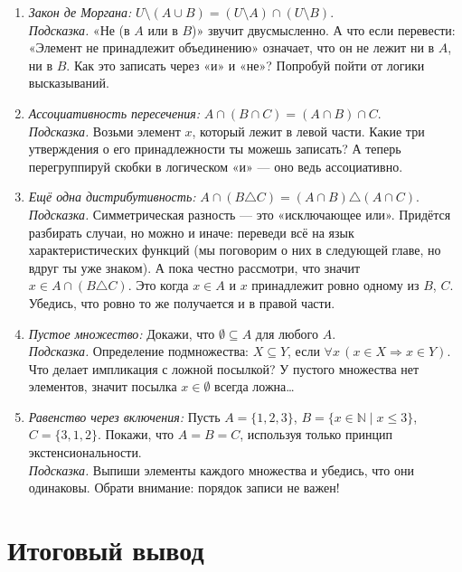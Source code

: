 \begin{enumerate}
  \item \emph{Закон де Моргана:} $U \setminus (A \cup B) = (U \setminus A) \cap (U \setminus B)$. \\
    \textit{Подсказка.} «Не (в $A$ или в $B$)» звучит двусмысленно. А что если перевести: «Элемент не принадлежит объединению» означает, что он не лежит ни в $A$, ни в $B$. Как это записать через «и» и «не»? Попробуй пойти от логики высказываний.

  \item \emph{Ассоциативность пересечения:} $A \cap (B \cap C) = (A \cap B) \cap C$. \\
    \textit{Подсказка.} Возьми элемент $x$, который лежит в левой части. Какие три утверждения о его принадлежности ты можешь записать? А теперь перегруппируй скобки в логическом «и» — оно ведь ассоциативно.

  \item \emph{Ещё одна дистрибутивность:} $A \cap (B \triangle C) = (A \cap B) \triangle (A \cap C)$. \\
    \textit{Подсказка.} Симметрическая разность — это «исключающее или». Придётся разбирать случаи, но можно и иначе: переведи всё на язык характеристических функций (мы поговорим о них в следующей главе, но вдруг ты уже знаком). А пока честно рассмотри, что значит $x \in A \cap (B \triangle C)$. Это когда $x \in A$ и $x$ принадлежит ровно одному из $B$, $C$. Убедись, что ровно то же получается и в правой части.

  \item \emph{Пустое множество:} Докажи, что $\emptyset \subseteq A$ для любого $A$. \\
    \textit{Подсказка.} Определение подмножества: $X \subseteq Y$, если $\forall x \,(x \in X \Rightarrow x \in Y)$. Что делает импликация с ложной посылкой? У пустого множества нет элементов, значит посылка $x \in \emptyset$ всегда ложна…

  \item \emph{Равенство через включения:} Пусть $A = \{1,2,3\}$, $B = \{x \in \mathbb{N} \mid x \le 3\}$, $C = \{3,1,2\}$. Покажи, что $A = B = C$, используя только принцип экстенсиональности. \\
    \textit{Подсказка.} Выпиши элементы каждого множества и убедись, что они одинаковы. Обрати внимание: порядок записи не важен!
\end{enumerate}

\section{Итоговый вывод}
\label{sec:conclusion-ch1}

